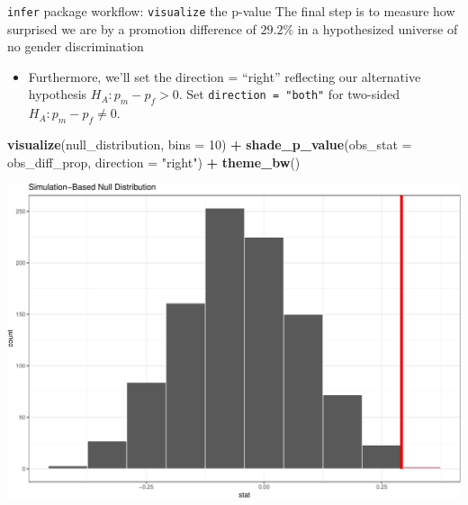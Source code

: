 \documentclass[
  ignorenonframetext,
]{beamer}
\newenvironment{Shaded}{\begin{snugshade}}{\end{snugshade}}
\newcommand{\AttributeTok}[1]{\textcolor[rgb]{0.13,0.29,0.53}{#1}}
\newcommand{\DecValTok}[1]{\textcolor[rgb]{0.00,0.00,0.81}{#1}}
\newcommand{\FunctionTok}[1]{\textcolor[rgb]{0.13,0.29,0.53}{\textbf{#1}}}
\newcommand{\NormalTok}[1]{#1}
\newcommand{\SpecialCharTok}[1]{\textcolor[rgb]{0.81,0.36,0.00}{\textbf{#1}}}
\newcommand{\StringTok}[1]{\textcolor[rgb]{0.31,0.60,0.02}{#1}}
\providecommand{\tightlist}{%
  \setlength{\itemsep}{0pt}\setlength{\parskip}{0pt}}
\begin{document}
\begin{frame}[fragile]{\texttt{infer} package workflow:
\texttt{visualize} the p-value}
\protect\hypertarget{infer-package-workflow-visualize-the-p-value}{}
The final step is to measure how surprised we are by a promotion
difference of \(29.2\%\) in a hypothesized universe of no gender
discrimination

\begin{itemize}
\tightlist
\item
  Furthermore, we'll set the direction = ``right'' reflecting our
  alternative hypothesis \(H_A: p_m-p_f>0\). Set
  \texttt{direction\ =\ "both"} for two-sided \(H_A: p_m-p_f\neq 0\).
\end{itemize}

\tiny

\begin{Shaded}
\begin{Highlighting}[]
\FunctionTok{visualize}\NormalTok{(null\_distribution, }\AttributeTok{bins =} \DecValTok{10}\NormalTok{) }\SpecialCharTok{+} 
  \FunctionTok{shade\_p\_value}\NormalTok{(}\AttributeTok{obs\_stat =}\NormalTok{ obs\_diff\_prop, }\AttributeTok{direction =} \StringTok{"right"}\NormalTok{) }\SpecialCharTok{+} 
  \FunctionTok{theme\_bw}\NormalTok{()}
\end{Highlighting}
\end{Shaded}

\begin{center}\includegraphics[width=0.7\linewidth,height=0.4\textheight]{Week11_12_13_files/figure-beamer/unnamed-chunk-55-1} \end{center}
\normalsize
\end{frame}
\end{document}
